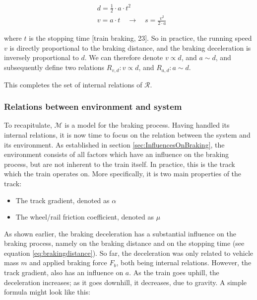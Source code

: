 \begin{equation}
\label{eq:brakingdistance}
\begin{aligned}
&d=\frac{1}{2} \cdot a \cdot t^{2} \\
&v=a \cdot t \quad \rightarrow \quad s=\frac{v^{2}}{2 \cdot a}
\end{aligned}
\end{equation}

\noindent
where $t$ is the stopping time [train braking, 23]. So in practice, the running speed $v$ is directly proportional to the braking distance, and the braking deceleration is inversely proportional to $d$. We can therefore denote $v \propto d$, and $a \sim d$, and subsequently define two relations $R_{v,d}: v \propto d$, and $R_{a,d}: a \sim d$.
\par
This completes the set of internal relations of ${\mathcal{R}}$.

\subsubsection{Relations between environment and system}
\label{sec:RelationsEnvironmentSystem}
\par\noindent
To recapitulate, ${\mathcal{M}}$ is a model for the braking process. Having handled its internal relations, it is now time to focus on the relation between the system and its environment. As established in section \ref{sec:InfluencesOnBraking}, the environment consists of all factors which have an influence on the braking process, but are not inherent to the train itself. In practice, this is the track which the train operates on. More specifically, it is two main properties of the track:
\begin{itemize}
	\item The track gradient, denoted as $\alpha$
	\item The wheel/rail friction coefficient, denoted as $\mu$
\end{itemize}
\noindent
As shown earlier, the braking deceleration has a substantial influence on the braking process, namely on the braking distance and on the stopping time (see equation \ref{eq:brakingdistance}). So far, the deceleration was only related to vehicle mass $m$ and applied braking force $F_{b}$, both being internal relations. However, the track gradient, also has an influence on $a$. As the train goes uphill, the deceleration increases; as it goes downhill, it decreases, due to gravity. A simple formula might look like this:

